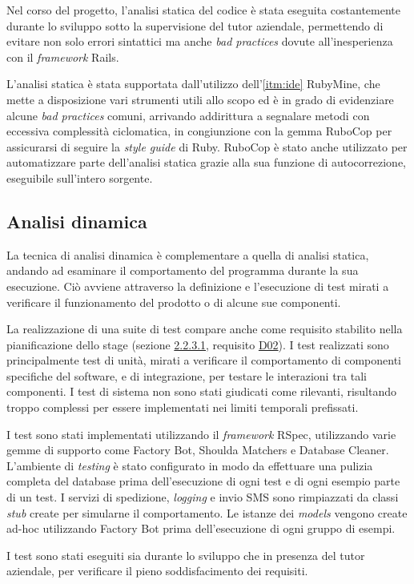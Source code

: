 Nel corso del progetto, l'analisi statica del codice è stata eseguita costantemente durante lo sviluppo sotto la supervisione del tutor aziendale, permettendo di evitare non solo errori sintattici ma anche \textit{bad practices} dovute all'inesperienza con il \textit{framework} Rails.

L'analisi statica è stata supportata dall'utilizzo dell'\ref{itm:ide} RubyMine, che mette a disposizione vari strumenti utili allo scopo ed è in grado di evidenziare alcune \textit{bad practices} comuni, arrivando addirittura a segnalare metodi con eccessiva complessità ciclomatica, in congiunzione con la gemma RuboCop per assicurarsi di seguire la \textit{style guide} di Ruby. RuboCop è stato anche utilizzato per automatizzare parte dell'analisi statica grazie alla sua funzione di autocorrezione, eseguibile sull'intero sorgente.
\subsection{Analisi dinamica}
La tecnica di analisi dinamica è complementare a quella di analisi statica, andando ad esaminare il comportamento del programma durante la sua esecuzione. Ciò avviene attraverso la definizione e l'esecuzione di test mirati a verificare il funzionamento del prodotto o di alcune sue componenti.

La realizzazione di una suite di test compare anche come requisito stabilito nella pianificazione dello stage (sezione \hyperref[sec:reqs]{2.2.3.1}, requisito \underline{D02}). I test realizzati sono principalmente test di unità, mirati a verificare il comportamento di componenti specifiche del software, e di integrazione, per testare le interazioni tra tali componenti. I test di sistema non sono stati giudicati come rilevanti, risultando troppo complessi per essere implementati nei limiti temporali prefissati.

I test sono stati implementati utilizzando il \textit{framework} RSpec, utilizzando varie gemme di supporto come Factory Bot, Shoulda Matchers e Database Cleaner. L'ambiente di \textit{testing} è stato configurato in modo da effettuare una pulizia completa del database prima dell'esecuzione di ogni test e di ogni esempio parte di un test. I servizi di spedizione, \textit{logging} e invio SMS sono rimpiazzati da classi \textit{stub} create per simularne il comportamento. Le istanze dei \textit{models} vengono create ad-hoc utilizzando Factory Bot prima dell'esecuzione di ogni gruppo di esempi.

I test sono stati eseguiti sia durante lo sviluppo che in presenza del tutor aziendale, per verificare il pieno soddisfacimento dei requisiti.
